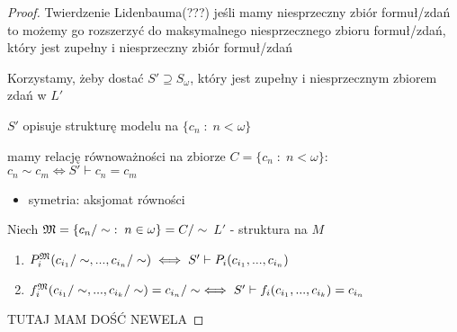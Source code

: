 \begin{proof}
  Twierdzenie Lidenbauma(???) jeśli mamy niesprzeczny zbiór formuł/zdań to możemy go rozszerzyć do maksymalnego niesprzecznego zbioru formuł/zdań, który jest zupełny i niesprzeczny zbiór formuł/zdań
  
  Korzystamy, żeby dostać $S'\supseteq S_\omega$, który jest zupełny i niesprzecznym zbiorem zdań w $L'$

  $S'$ opisuje strukturę modelu na $\{c_n\;:\;n<\omega\}$

  mamy relację równoważności na zbiorze $C=\{c_n\;:\;n<\omega\}$: $c_n\sim c_m\iff S'\vdash c_n=c_m$
  \begin{itemize}
    \item symetria: aksjomat równości
  \end{itemize}

  Niech $\mathfrak{M}=\{c_n/\sim\;:\;n\in\omega\}=C/\sim$
  $L'$ - struktura na $M$
  \begin{enumerate}
    \item $P_i^{\mathfrak{M}}(c_{i_1}/\sim,...,c_{i_n}/\sim)\iff S'\vdash P_i(c_{i_1},...,c_{i_n})$
    \item $f^{\mathfrak{M}}_i(c_{i_1}/\sim,...,c_{i_k}/\sim)=c_{i_n}/\sim\iff S'\vdash f_i(c_{i_1},..., c_{i_k})=c_{i_n}$
  \end{enumerate}

  {\color{red}TUTAJ MAM DOŚĆ NEWELA}
\end{proof}







